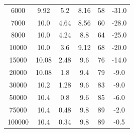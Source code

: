\documentclass[letterpaper,12pt]{article}
\begin{document}
\begin{table}[htbp]
\begin{tabular}{cccccc}
        6000 & 9.92 & 5.2 & 8.16 & 58 & -31.0 \\
        7000 & 10.0 & 4.64 & 8.56 & 60 & -28.0 \\
        8000 & 10.0 & 4.24 & 8.8 & 64 & -25.0 \\
        10000 & 10.0 & 3.6 & 9.12 & 68 & -20.0 \\
        15000 & 10.08 & 2.48 & 9.6 & 76 & -14.0 \\
        20000 & 10.08 & 1.8 & 9.4 & 79 & -9.0 \\
        30000 & 10.2 & 1.28 & 9.6 & 83 & -9.0 \\
        50000 & 10.4 & 0.8 & 9.6 & 85 & -6.0 \\
        75000 & 10.4 & 0.48 & 9.8 & 89 & -2.0 \\
        100000 & 10.4 & 0.34 & 9.8 & 89 & -0.5 \\
        \bottomrule
    \end{tabular}
\end{table}
\end{document}
